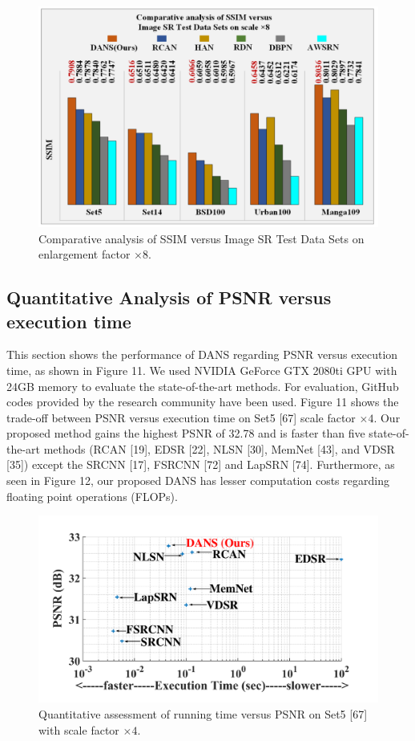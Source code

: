 \documentclass{ieeeaccess}
\begin{document}
\begin{figure}[ht]
  \includegraphics[width=\linewidth]{10FIGURE.pdf}
  \caption{Comparative analysis of SSIM versus Image SR Test Data Sets on enlargement factor $\times8$.}
  \label{fig:10}
\end{figure}

\subsection{Quantitative Analysis of PSNR versus execution time }
This section shows the performance of DANS regarding PSNR versus execution time, as shown in Figure 11. We used  NVIDIA GeForce GTX 2080ti GPU with 24GB memory to evaluate the state-of-the-art methods. For evaluation, GitHub codes provided by the research community have been used. Figure 11 shows the trade-off between  PSNR versus execution time on Set5 [67] scale factor $\times4$. Our proposed method gains the highest PSNR of 32.78 and is faster than five state-of-the-art methods (RCAN [19], EDSR [22], NLSN [30], MemNet [43], and VDSR [35]) except the SRCNN [17], FSRCNN [72] and LapSRN [74]. Furthermore, as seen in Figure 12, our proposed DANS has lesser computation costs regarding floating point operations (FLOPs).

\begin{figure}[ht]
  \includegraphics[width=\linewidth]{11FIGURE.pdf}
  \caption{Quantitative assessment of running time versus PSNR on Set5 [67] with scale factor $\times4$.}
  \label{fig:11}
\end{figure}
\end{document}
